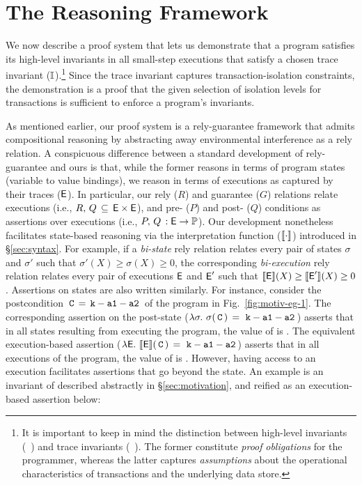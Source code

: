 \section{The Reasoning Framework}
\label{sec:reasoning}

We now describe a proof system that lets us demonstrate that a \txnimp
program satisfies its high-level invariants in all small-step
executions that satisfy a chosen trace invariant ($\mathbb{I}$).\footnote{It is
important to keep in mind the distinction between high-level invariants
(\eg~) and trace invariants (\eg~). The former
constitute \emph{proof} \emph{obligations} for the programmer, whereas
the latter captures \emph{assumptions} about the operational characteristics
of transactions and the underlying data store. } 
Since the trace invariant captures transaction-isolation constraints,
the demonstration is a proof that the given selection of isolation
levels for transactions is sufficient to enforce a program's invariants.

As mentioned earlier, our proof system is a rely-guarantee framework
that admits compositional reasoning by abstracting away 
environmental interference as a rely relation. A conspicuous
difference between a standard development of rely-guarantee and ours
is that, while the former reasons in terms of program states (variable
to value bindings), we reason in terms of executions as captured by
their traces ($\textsf{E}$). In particular, our rely ($R$) and guarantee ($G$)
relations relate executions (i.e., $R,\,Q\,\subseteq\,\textsf{E}\times\textsf{E}$),
and pre- ($P$) and post- ($Q$) conditions as assertions over executions
(i.e., $P,\,Q\, : \textsf{E} \rightarrow \mathbb{P}$). Our development nonetheless
facilitates state-based reasoning via the interpretation function
($\llbracket \cdot \rrbracket$) introduced in \S\ref{sec:syntax}. For example, if a
\emph{bi-state} rely relation relates every pair of states $\sigma$
and $\sigma'$ such that $\sigma'(X) \ge \sigma(X) \ge 0$, the
corresponding \emph{bi-execution} rely relation relates every pair of
executions $\textsf{E}$ and $\textsf{E}'$ such that $\llbracket \textsf{E} \rrbracket(X) \ge
\llbracket \textsf{E}' \rrbracket(X) \ge 0$.  Assertions on states are also written
similarly. For instance, consider the postcondition
$\,{\tt C\,=\,k-a1-a2}\,$ of the program in Fig.~\ref{fig:motiv-eg-1}. The
corresponding assertion on the post-state
($\lambda\sigma.~\sigma(\,{\tt C}\,) \,=\, \,{\tt k-a1-a2}\,$) asserts that in all
states resulting from executing the program, the value of  is
. The equivalent execution-based assertion
($\lambda\textsf{E}.~\llbracket \textsf{E} \rrbracket(\,{\tt C}\,)\,=\,\,{\tt k-a1-a2}\,$) asserts that in all
executions of the program, the value of  is .
However, having access to an execution facilitates assertions that go
beyond the state. An example is an invariant of  described
abstractly in \S\ref{sec:motivation}, and reified as an
execution-based assertion below:

